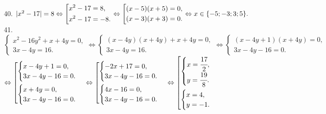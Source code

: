 \documentclass[12pt]{article}
\begin{document}
40. $|x^2-17|=8\Leftrightarrow\left[\begin{gathered} x^2-17=8,\hfill\\
      x^2-17=-8.\hfill \end{gathered}\right.\Leftrightarrow\left[\begin{gathered} (x-5)(x+5)=0,\hfill\\
      (x-3)(x+3)=0.\hfill \end{gathered}\right. \Leftrightarrow x\in\{-5; -3; 3; 5\}.$\\
41. $\begin{cases}
x^2-16y^2+x+4y=0,\\
3x-4y=16.
\end{cases}\Leftrightarrow\begin{cases}
(x-4y)(x+4y)+x+4y=0,\\
3x-4y=16.
\end{cases}\Leftrightarrow\begin{cases}
(x-4y+1)(x+4y)=0,\\
3x-4y-16=0.
\end{cases}$\\$\Leftrightarrow \left[
      \begin{gathered} \begin{cases}x-4y+1=0,\\3x-4y-16=0.\end{cases}\hfill\\
      \begin{cases}x+4y=0,\\3x-4y-16=0.\end{cases}\hfill \end{gathered}\right.\Leftrightarrow \left[
      \begin{gathered} \begin{cases}-2x+17=0,\\3x-4y-16=0.\end{cases}\hfill\\
      \begin{cases}4x-16=0,\\3x-4y-16=0.\end{cases}\hfill \end{gathered}\right.\Leftrightarrow \left[
      \begin{gathered} \begin{cases}x=\cfrac{17}{2},\\y=\cfrac{19}{8}.\end{cases}\hfill\\
      \begin{cases}x=4,\\y=-1.\end{cases}\hfill \end{gathered}\right.$\\
\end{document}
